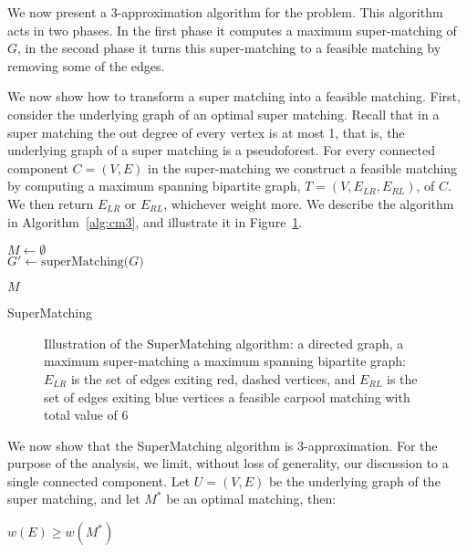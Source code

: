 \label{sec:cm}
We now present a 3-app\-roximation algorithm for the \textsc{\CARPOOL{}} problem.
This algorithm acts in two phases.
In the first phase it computes a maximum super-matching of $G$, 
in the second phase it turns this super-matching to a feasible matching
by removing some of the edges.

We now show how to transform a super matching into a feasible matching.
First, consider the underlying graph of an optimal super matching.
Recall that in a super matching the out degree of every vertex is at most 1,
that is, the underlying graph of a super matching is a pseudoforest.
For every connected component $C = (V, E)$ 
in the super-matching we construct a feasible matching by
computing a maximum spanning bipartite graph, $T = (V, E_{LR}, E_{RL})$, 
of $C$. 
We then return $E_{LR}$ or $E_{RL}$, whichever weight more. 
We describe the algorithm in Algorithm~\ref{alg:cm3}, 
and illustrate it in Figure~\ref{fig:spanning-bipartite-graph}.   

\begin{algorithm}[t]

$M \leftarrow \emptyset$								\\
$G' \leftarrow \text{superMatching($G$)}$				\\


\Return $M$
\caption{
\label{alg:cm3}
SuperMatching}
\end{algorithm}

\begin{figure}
\centering

\caption[]{
\label{fig:spanning-bipartite-graph}
Illustration of the SuperMatching algorithm:
 a directed graph, 
 a maximum super-matching  
 a maximum spanning bipartite graph:
$E_{LR}$ is the set of edges exiting red, dashed vertices, 
and $E_{RL}$ is the set of edges exiting blue vertices
 a feasible carpool matching with total value of 6   
}
\end{figure}

We now show that the SuperMatching algorithm is 3-approximation.
For the purpose of the analysis, we limit, without loss of generality, 
our discussion to a single connected component.
Let $U = (V, E)$ be the underlying graph of the super matching, 
and let $M^*$ be an optimal matching, then:
\begin{lemma}
\label{lm:super-geq-m^*}
$w(E) \geq w(M^*)$
\end{lemma}

